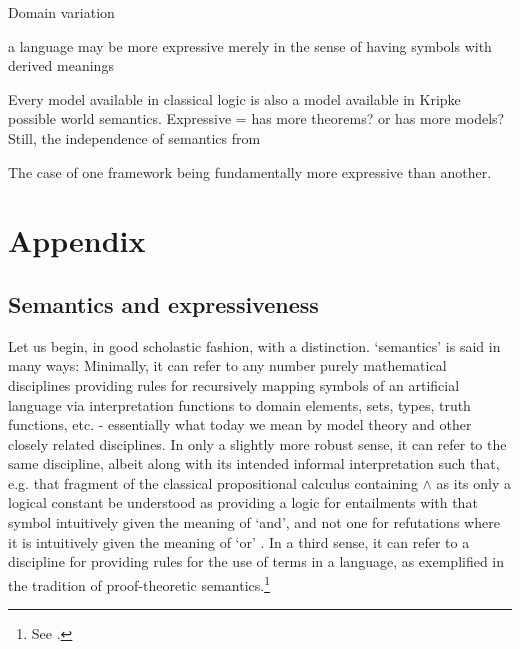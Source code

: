 \documentclass[]{article}
\begin{document}


Domain variation

a language may be more expressive merely in the sense of having symbols with derived meanings 

Every model available in classical logic is also a model available in Kripke possible world semantics.
Expressive = has more theorems? or has more models?
Still, the independence of semantics from 




The case of one framework being fundamentally more expressive than another.
\section{Appendix}
\subsection{Semantics and expressiveness}
Let us begin, in good scholastic fashion, with a distinction.
`semantics' is said in many ways: 
Minimally, it can refer to any number purely mathematical disciplines providing rules for recursively mapping symbols of an artificial language via interpretation functions to domain elements, sets, types, truth functions, etc. - essentially what today we mean by model theory and other closely related disciplines. 
In only a slightly more robust sense, 
it can refer to the same discipline, 
albeit along with its intended informal interpretation such that, 
e.g. that fragment of the classical propositional calculus containing $\wedge$ as its only a logical constant be understood as providing a logic for entailments with that symbol intuitively given the meaning of `and', 
and not one for refutations where it is intuitively given the meaning of `or' .
In a third sense, 
it can refer to a discipline for providing rules for the use of terms in a language, as exemplified in the tradition of proof-theoretic semantics.\footnote{See \autocite{Francez2016b,Read2010,Schroeder-Heister2006}.} 
\end{document}
